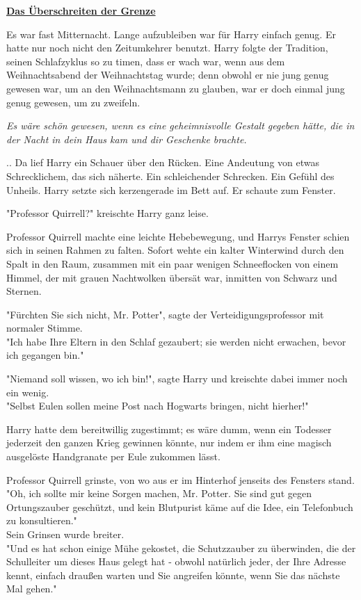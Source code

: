 

\hypertarget{das-uxfcberschreiten-der-grenze}{%

\textbf{\uline{Das Überschreiten der Grenze}}

Es war fast Mitternacht. Lange aufzubleiben war für Harry einfach genug. Er hatte nur noch nicht den Zeitumkehrer benutzt. Harry folgte der Tradition, seinen Schlafzyklus so zu timen, dass er wach war, wenn aus dem Weihnachtsabend der Weihnachtstag wurde; denn obwohl er nie jung genug gewesen war, um an den Weihnachtsmann zu glauben, war er doch einmal jung genug gewesen, um zu zweifeln.

\emph{Es wäre schön gewesen, wenn es eine geheimnisvolle Gestalt gegeben hätte, die in der Nacht in dein Haus kam und dir Geschenke brachte.}

.. Da lief Harry ein Schauer über den Rücken. Eine Andeutung von etwas Schrecklichem, das sich näherte. Ein schleichender Schrecken. Ein Gefühl des Unheils. Harry setzte sich kerzengerade im Bett auf. Er schaute zum Fenster.

"Professor Quirrell?" kreischte Harry ganz leise.

Professor Quirrell machte eine leichte Hebebewegung, und Harrys Fenster schien sich in seinen Rahmen zu falten. Sofort wehte ein kalter Winterwind durch den Spalt in den Raum, zusammen mit ein paar wenigen Schneeflocken von einem Himmel, der mit grauen Nachtwolken übersät war, inmitten von Schwarz und Sternen.

"Fürchten Sie sich nicht, Mr. Potter", sagte der Verteidigungsprofessor mit normaler Stimme.\\ "Ich habe Ihre Eltern in den Schlaf gezaubert; sie werden nicht erwachen, bevor ich gegangen bin."

"Niemand soll wissen, wo ich bin!", sagte Harry und kreischte dabei immer noch ein wenig.\\ "Selbst Eulen sollen meine Post nach Hogwarts bringen, nicht hierher!"

Harry hatte dem bereitwillig zugestimmt; es wäre dumm, wenn ein Todesser jederzeit den ganzen Krieg gewinnen könnte, nur indem er ihm eine magisch ausgelöste Handgranate per Eule zukommen lässt.

Professor Quirrell grinste, von wo aus er im Hinterhof jenseits des Fensters stand.\\ "Oh, ich sollte mir keine Sorgen machen, Mr. Potter. Sie sind gut gegen Ortungszauber geschützt, und kein Blutpurist käme auf die Idee, ein Telefonbuch zu konsultieren."\\ Sein Grinsen wurde breiter.\\ "Und es hat schon einige Mühe gekostet, die Schutzzauber zu überwinden, die der Schulleiter um dieses Haus gelegt hat - obwohl natürlich jeder, der Ihre Adresse kennt, einfach draußen warten und Sie angreifen könnte, wenn Sie das nächste Mal gehen."

}

